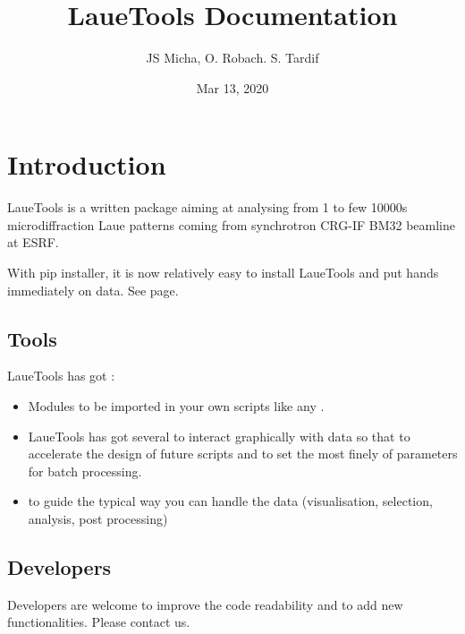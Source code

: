 \documentclass[letterpaper,10pt,english]{sphinxmanual}
\title{LaueTools Documentation}
\date{Mar 13, 2020}
\author{JS Micha, O. Robach. S. Tardif}
\begin{document}
\maketitle
\sphinxtableofcontents
{}\label{\detokenize{index::doc}}



\chapter{Introduction}
\label{\detokenize{intro::doc}}\label{\detokenize{intro:welcome-to-lauetools-s-documentation}}\label{\detokenize{intro:introduction}}
LaueTools is a  written package aiming at analysing from 1 to few 10000s microdiffraction Laue patterns coming from synchrotron CRG-IF BM32 beamline at ESRF.

With pip installer, it is now relatively easy to install LaueTools and put hands immediately on data. See {\hyperref[\detokenize{installation:installation}]{}} page.


\section{Tools}
\label{\detokenize{intro:tools}}
LaueTools has got :
\begin{itemize}
\item {} 
Modules to be imported in your own scripts like any .

\item {} 
LaueTools has got several {\hyperref[\detokenize{GUIs:guis}]{}} to interact graphically with data so that to accelerate the design of future scripts and to set the most finely of parameters for batch processing.

\item {} 
 to guide the typical way you can handle the data (visualisation, selection, analysis, post processing)

\end{itemize}


\section{Developers}
\label{\detokenize{intro:developers}}
Developers are welcome to improve the code readability and to add new functionalities. Please contact us.
\end{document}
